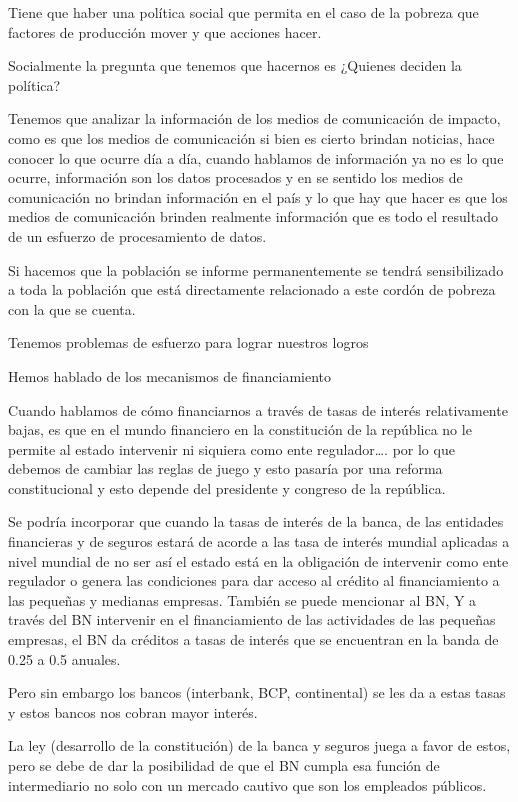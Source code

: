 \documentclass[
  a4paper,
]{article}
\begin{document}
Tiene que haber una política social que permita en el caso de la pobreza
que factores de producción mover y que acciones hacer.

Socialmente la pregunta que tenemos que hacernos es ¿Quienes deciden la
política?

Tenemos que analizar la información de los medios de comunicación de
impacto, como es que los medios de comunicación si bien es cierto
brindan noticias, hace conocer lo que ocurre día a día, cuando hablamos
de información ya no es lo que ocurre, información son los datos
procesados y en se sentido los medios de comunicación no brindan
información en el país y lo que hay que hacer es que los medios de
comunicación brinden realmente información que es todo el resultado de
un esfuerzo de procesamiento de datos.

Si hacemos que la población se informe permanentemente se tendrá
sensibilizado a toda la población que está directamente relacionado a
este cordón de pobreza con la que se cuenta.

Tenemos problemas de esfuerzo para lograr nuestros logros

Hemos hablado de los mecanismos de financiamiento

Cuando hablamos de cómo financiarnos a través de tasas de interés
relativamente bajas, es que en el mundo financiero en la constitución de
la república no le permite al estado intervenir ni siquiera como ente
regulador\ldots. por lo que debemos de cambiar las reglas de juego y
esto pasaría por una reforma constitucional y esto depende del
presidente y congreso de la república.

Se podría incorporar que cuando la tasas de interés de la banca, de las
entidades financieras y de seguros estará de acorde a las tasa de
interés mundial aplicadas a nivel mundial de no ser así el estado está
en la obligación de intervenir como ente regulador o genera las
condiciones para dar acceso al crédito al financiamiento a las pequeñas
y medianas empresas. También se puede mencionar al BN, Y a través del BN
intervenir en el financiamiento de las actividades de las pequeñas
empresas, el BN da créditos a tasas de interés que se encuentran en la
banda de 0.25 a 0.5 anuales.

Pero sin embargo los bancos (interbank, BCP, continental) se les da a
estas tasas y estos bancos nos cobran mayor interés.

La ley (desarrollo de la constitución) de la banca y seguros juega a
favor de estos, pero se debe de dar la posibilidad de que el BN cumpla
esa función de intermediario no solo con un mercado cautivo que son los
empleados públicos.
\end{document}
